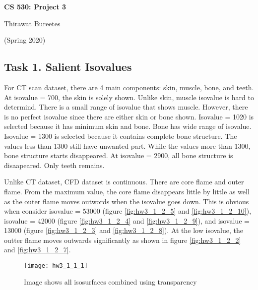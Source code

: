 \documentclass[11pt]{article}
\begin{document}
\begin{center}
\Large{\textbf{CS 530: Project 3}}

Thirawat Bureetes

(Spring 2020)
\end{center}

\subsection*{Task 1. Salient Isovalues}

For CT scan dataset, there are 4 main components: skin, muscle, bone, and teeth. 
At isovalue = 700, the skin is solely shown.
Unlike skin, muscle isovalue is hard to determind. There is a small range of isovalue that shows muscle. However, there is no perfect isovalue since there are either skin or bone shown. Isovalue = 1020 is selected because it has minimum skin and bone.
Bone has wide range of isovalue. Isovalue = 1300 is selected because it contains complete bone structure. The values less than 1300 still have unwanted part. While the values more than 1300, bone structure starts disappeared. At isovalue = 2900, all bone structure is disaapeared. Only teeth remains.


Unlike CT dataset, CFD dataset is continuous. There are core flame and outer flame. From the maximum value, the core flame disappears little by little as well as the outer flame moves outwords when the isovalue goes down. This is obvious when consider isovalue = 53000 (figure \ref{fig:hw3_1_2_5} and \ref{fig:hw3_1_2_10}), isovalue = 42000 (figure \ref{fig:hw3_1_2_4} and \ref{fig:hw3_1_2_9}), and isovalue = 13000 (figure \ref{fig:hw3_1_2_3} and \ref{fig:hw3_1_2_8}). At the low isovalue, the outter flame moves outwards significantly as shown in figure \ref{fig:hw3_1_2_2} and \ref{fig:hw3_1_2_7}.

\newpage

\begin{figure}[H]
\centering
\texttt{[image: hw3\_1\_1\_1]}
\caption{Image shows all isosurfaces combined using transparency}
\label{fig:hw3_1_1_1}
\end{figure}
\end{document}
